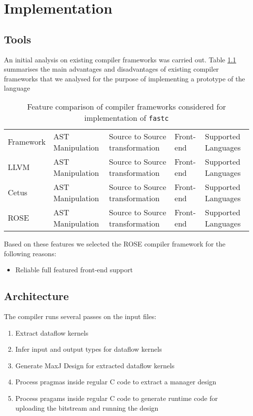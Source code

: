 \chapter{Implementation}
\label{sec:implementation}

\section{Tools}

An initial analysis on existing compiler frameworks was carried
out. Table \ref{table:compiler-comparison} summarises the main
advantages and disadvantages of existing compiler frameworks that we
analysed for the purpose of implementing a prototype of the \FAST{}
language

\begin{table}[ht!]
\begin{tabularx}{\textwidth}{X|X|X|X|X}
  Framework & AST Manipulation & Source to Source transformation & Front-end & Supported Languages \\
  LLVM\cite{LLVM} & AST Manipulation & Source to Source transformation & Front-end & Supported Languages \\
  Cetus\cite{Cetus} & AST Manipulation & Source to Source transformation & Front-end & Supported Languages \\
  ROSE\cite{}& AST Manipulation & Source to Source transformation & Front-end & Supported Languages \\
\end{tabularx}\cite{ROSE, Quinlan:2000}
\caption{Feature comparison of compiler frameworks considered for implementation of \texttt{fastc}}
\label{table:compiler-comparison}
\end{table}

Based on these features we selected the ROSE compiler framework for the following reasons:
\begin{itemize}
\item Reliable full featured front-end support
\end{itemize}


\section{Architecture}

The compiler runs several passes on the input files:

\begin{enumerate}
\item Extract dataflow kernels
\item Infer input and output types for dataflow kernels
\item Generate MaxJ Design for extracted dataflow kernels
\item Process pragmas inside regular C code to extract a manager design
\item Process pragams inside regular C code to generate runtime code for uploading the bitstream and running the design
\end{enumerate}

